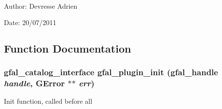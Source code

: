 \begin{Desc}
\item[Author:]Devresse Adrien \end{Desc}
\begin{Desc}
\item[Date:]20/07/2011 \end{Desc}


\subsection{Function Documentation}
\subsubsection{\setlength{\rightskip}{0pt plus 5cm}\bf{gfal\_\-catalog\_\-interface} gfal\_\-plugin\_\-init (gfal\_\-handle {\em handle}, GError $\ast$$\ast$ {\em err})}\label{gfal__dcap__plugin__main_8h_5c9edde4d67d96432a319d940a4799f1}


Init function, called before all 